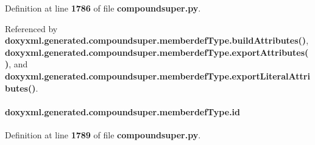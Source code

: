 Definition at line {\bf 1786} of file {\bf compoundsuper.\+py}.



Referenced by {\bf doxyxml.\+generated.\+compoundsuper.\+memberdef\+Type.\+build\+Attributes()}, {\bf doxyxml.\+generated.\+compoundsuper.\+memberdef\+Type.\+export\+Attributes()}, and {\bf doxyxml.\+generated.\+compoundsuper.\+memberdef\+Type.\+export\+Literal\+Attributes()}.

\paragraph[{id}]{\setlength{\rightskip}{0pt plus 5cm}doxyxml.\+generated.\+compoundsuper.\+memberdef\+Type.\+id}\label{classdoxyxml_1_1generated_1_1compoundsuper_1_1memberdefType_a41409f3bada4d45527c86b01a7487fcd}


Definition at line {\bf 1789} of file {\bf compoundsuper.\+py}.



